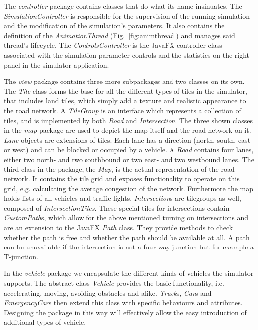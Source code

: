 The \textit{controller} package contains classes that do what its name insinuates. The \textit{SimulationController} is responsible for the supervision of the running simulation and the modification of the simulation's parameters.  It also contains the definition of the \textit{AnimationThread} (Fig.~\ref{fig:animthread}) and manages said thread's lifecycle. The \textit{ControlsController} is the JavaFX controller class associated with the simulation parameter controls and the statistics on the right panel in the simulator application. 

The \textit{view} package contains three more subpackages and two classes on its own. The \textit{Tile} class forms the base for all the different types of tiles in the simulator, that includes land tiles, which simply add a texture and realistic appearance to the road network. A \textit{TileGroup} is an interface which represents a collection of tiles, and is implemented by both \textit{Road} and \textit{Intersection}.  The three shown classes in the \textit{map} package are used to depict the map itself and the road network on it. \textit{Lane} objects are extensions of tiles. Each lane has a direction (north, south, east or west) and can be blocked or occupied by a vehicle. A \textit{Road} contains four lanes, either two north- and two southbound or two east- and two westbound lanes. The third class in the package, the \textit{Map}, is the actual representation of the road network. It contains the tile grid and exposes functionality to operate on this grid, e.g. calculating the average congestion of the network. Furthermore the map holds lists of all vehicles and traffic lights. \textit{Intersection}s are tilegroups as well, composed of \textit{IntersectionTiles}. These special tiles for intersections contain \textit{CustomPath}s, which allow for the above mentioned turning on intersections and are an extension to the JavaFX \textit{Path} class. They provide methods to check whether the path is free and whether the path should be available at all. A path can be unavailable if the intersection is not a four-way junction but for example a T-junction.  

In the \textit{vehicle} package we encapsulate the different kinds of vehicles the simulator supports. The abstract class \textit{Vehicle} provides the basic functionality, i.e. accelerating, moving, avoiding obstacles and alike. \textit{Truck}s, \textit{Car}s and \textit{EmergencyCar}s then extend this class with specific behaviours and attributes. Designing the package in this way will effectively allow the easy introduction of additional types of vehicle.

